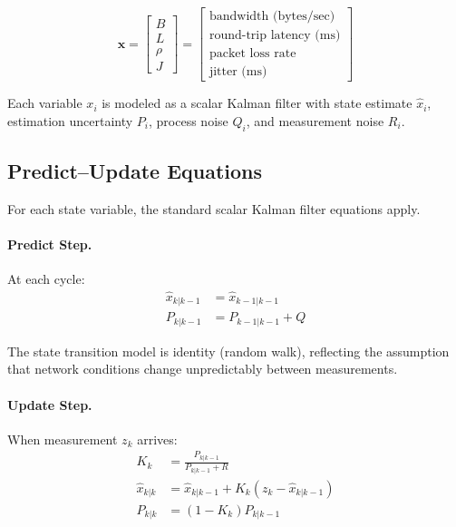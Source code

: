 \documentclass[11pt,a4paper]{article}
\begin{document}
\begin{equation}
\mathbf{x} = \begin{bmatrix} B \\ L \\ \rho \\ J \end{bmatrix}
= \begin{bmatrix} \text{bandwidth (bytes/sec)} \\ \text{round-trip latency (ms)} \\ \text{packet loss rate} \\ \text{jitter (ms)} \end{bmatrix}
\end{equation}

Each variable $x_i$ is modeled as a scalar Kalman filter with state estimate $\hat{x}_i$, estimation uncertainty $P_i$, process noise $Q_i$, and measurement noise $R_i$.

\subsection{Predict--Update Equations}

For each state variable, the standard scalar Kalman filter equations apply.

\paragraph{Predict Step.} At each cycle:
\begin{align}
\hat{x}_{k|k-1} &= \hat{x}_{k-1|k-1} \label{eq:predict_state} \\
P_{k|k-1} &= P_{k-1|k-1} + Q \label{eq:predict_cov}
\end{align}

The state transition model is identity (random walk), reflecting the assumption that network conditions change unpredictably between measurements.

\paragraph{Update Step.} When measurement $z_k$ arrives:
\begin{align}
K_k &= \frac{P_{k|k-1}}{P_{k|k-1} + R} \label{eq:kalman_gain} \\
\hat{x}_{k|k} &= \hat{x}_{k|k-1} + K_k (z_k - \hat{x}_{k|k-1}) \label{eq:update_state} \\
P_{k|k} &= (1 - K_k) P_{k|k-1} \label{eq:update_cov}
\end{align}
\end{document}
